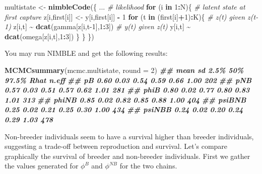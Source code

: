 \documentclass[
  12pt,
]{krantz}
\newenvironment{Shaded}{\begin{snugshade}}{\end{snugshade}}
\newcommand{\AttributeTok}[1]{\textcolor[rgb]{0.13,0.29,0.53}{#1}}
\newcommand{\CommentTok}[1]{\textcolor[rgb]{0.56,0.35,0.01}{\textit{#1}}}
\newcommand{\ControlFlowTok}[1]{\textcolor[rgb]{0.13,0.29,0.53}{\textbf{#1}}}
\newcommand{\DecValTok}[1]{\textcolor[rgb]{0.00,0.00,0.81}{#1}}
\newcommand{\DocumentationTok}[1]{\textcolor[rgb]{0.56,0.35,0.01}{\textbf{\textit{#1}}}}
\newcommand{\FunctionTok}[1]{\textcolor[rgb]{0.13,0.29,0.53}{\textbf{#1}}}
\newcommand{\NormalTok}[1]{#1}
\newcommand{\OtherTok}[1]{\textcolor[rgb]{0.56,0.35,0.01}{#1}}
\newcommand{\SpecialCharTok}[1]{\textcolor[rgb]{0.81,0.36,0.00}{\textbf{#1}}}
\begin{document}
\begin{Shaded}
\begin{Highlighting}[]
\NormalTok{multistate }\OtherTok{\textless{}{-}} \FunctionTok{nimbleCode}\NormalTok{(\{}
\NormalTok{...}
  \CommentTok{\# likelihood}
  \ControlFlowTok{for}\NormalTok{ (i }\ControlFlowTok{in} \DecValTok{1}\SpecialCharTok{:}\NormalTok{N)\{}
    \CommentTok{\# latent state at first capture}
\NormalTok{    z[i,first[i]] }\OtherTok{\textless{}{-}}\NormalTok{ y[i,first[i]] }\SpecialCharTok{{-}} \DecValTok{1}
    \ControlFlowTok{for}\NormalTok{ (t }\ControlFlowTok{in}\NormalTok{ (first[i]}\SpecialCharTok{+}\DecValTok{1}\NormalTok{)}\SpecialCharTok{:}\NormalTok{K)\{}
      \CommentTok{\# z(t) given z(t{-}1)}
\NormalTok{      z[i,t] }\SpecialCharTok{\textasciitilde{}} \FunctionTok{dcat}\NormalTok{(gamma[z[i,t}\DecValTok{{-}1}\NormalTok{],}\DecValTok{1}\SpecialCharTok{:}\DecValTok{3}\NormalTok{])}
      \CommentTok{\# y(t) given z(t)}
\NormalTok{      y[i,t] }\SpecialCharTok{\textasciitilde{}} \FunctionTok{dcat}\NormalTok{(omega[z[i,t],}\DecValTok{1}\SpecialCharTok{:}\DecValTok{3}\NormalTok{])}
\NormalTok{    \}}
\NormalTok{  \}}
\NormalTok{\})}
\end{Highlighting}
\end{Shaded}

You may run NIMBLE and get the following results:

\begin{Shaded}
\begin{Highlighting}[]
\FunctionTok{MCMCsummary}\NormalTok{(mcmc.multistate, }\AttributeTok{round =} \DecValTok{2}\NormalTok{)}
\DocumentationTok{\#\#        mean   sd 2.5\%  50\% 97.5\% Rhat n.eff}
\DocumentationTok{\#\# pB     0.60 0.03 0.54 0.59  0.66 1.00   202}
\DocumentationTok{\#\# pNB    0.57 0.03 0.51 0.57  0.62 1.01   281}
\DocumentationTok{\#\# phiB   0.80 0.02 0.77 0.80  0.83 1.01   313}
\DocumentationTok{\#\# phiNB  0.85 0.02 0.82 0.85  0.88 1.00   404}
\DocumentationTok{\#\# psiBNB 0.25 0.02 0.21 0.25  0.30 1.00   434}
\DocumentationTok{\#\# psiNBB 0.24 0.02 0.20 0.24  0.29 1.03   478}
\end{Highlighting}
\end{Shaded}

Non-breeder individuals seem to have a survival higher than breeder individuals, suggesting a trade-off between reproduction and survival. Let's compare graphically the survival of breeder and non-breeder individuals. First we gather the values generated for \(\phi^B\) and \(\phi^{NB}\) for the two chains.
\end{document}
